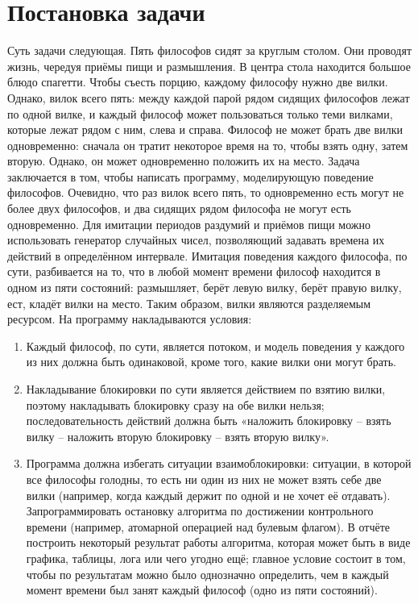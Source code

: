 \documentclass[a4paper, 14pt]{extarticle}
\begin{document}
\newpage

\tableofcontents

\newpage

\section{Постановка задачи}
Суть задачи следующая. Пять философов сидят за круглым столом. Они проводят
жизнь, чередуя приёмы пищи и размышления. В центра стола находится большое
блюдо спагетти. Чтобы съесть порцию, каждому философу нужно две вилки. Однако,
вилок всего пять: между каждой парой рядом сидящих философов лежат по одной
вилке, и каждый философ может пользоваться только теми вилками, которые лежат
рядом с ним, слева и справа. Философ не может брать две вилки одновременно:
сначала он тратит некоторое время на то, чтобы взять одну, затем вторую. Однако, он
может одновременно положить их на место.
Задача заключается в том, чтобы написать программу, моделирующую поведение
философов. Очевидно, что раз вилок всего пять, то одновременно есть могут не более
двух философов, и два сидящих рядом философа не могут есть одновременно. Для
имитации периодов раздумий и приёмов пищи можно использовать генератор
случайных чисел, позволяющий задавать времена их действий в определённом
интервале. Имитация поведения каждого философа, по сути, разбивается на то, что в
любой момент времени философ находится в одном из пяти состояний: размышляет,
берёт левую вилку, берёт правую вилку, ест, кладёт вилки на место. Таким образом,
вилки являются разделяемым ресурсом.
На программу накладываются условия:
\begin{enumerate}
	\item{Каждый философ, по сути, является потоком, и модель поведения у каждого из
них должна быть одинаковой, кроме того, какие вилки они могут брать.
		}
	\item{
	 Накладывание блокировки по сути является действием по взятию вилки,
поэтому накладывать блокировку сразу на обе вилки нельзя; последовательность
действий должна быть «наложить блокировку – взять вилку – наложить вторую
блокировку – взять вторую вилку».		
		}
	\item{
	Программа должна избегать ситуации взаимоблокировки: ситуации, в которой
все философы голодны, то есть ни один из них не может взять себе две вилки
(например, когда каждый держит по одной и не хочет её отдавать).
Запрограммировать остановку алгоритма по достижении контрольного времени
(например, атомарной операцией над булевым флагом). В отчёте построить некоторый
результат работы алгоритма, которая может быть в виде графика, таблицы, лога или
чего угодно ещё; главное условие состоит в том, чтобы по результатам можно было
однозначно определить, чем в каждый момент времени был занят каждый философ
(одно из пяти состояний).		
		}
\end{enumerate}
\end{document}
